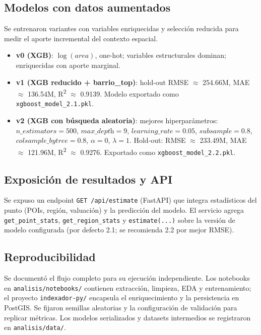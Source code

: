 \subsection*{Modelos con datos aumentados}
Se entrenaron variantes con variables enriquecidas y selección reducida para medir el aporte incremental del contexto espacial.
\begin{itemize}
    \item \textbf{v0 (XGB)}: \(\log(\textit{area})\), one-hot; variables estructurales dominan; enriquecidas con aporte marginal.
    \item \textbf{v1 (XGB reducido + barrio\_top)}: hold-out RMSE \(\approx\) 254.66M, MAE \(\approx\) 136.54M, R\textsuperscript{2} \(\approx\) 0.9139. Modelo exportado como \texttt{xgboost\_model\_2.1.pkl}.
    \item \textbf{v2 (XGB con búsqueda aleatoria)}: mejores hiperparámetros: \(n\_\textit{estimators}=500\), \(\textit{max\_depth}=9\), \(\textit{learning\_rate}=0.05\), \(\textit{subsample}=0.8\), \(\textit{colsample\_bytree}=0.8\), \(\alpha=0\), \(\lambda=1\). Hold-out: RMSE \(\approx\) 233.49M, MAE \(\approx\) 121.96M, R\textsuperscript{2} \(\approx\) 0.9276. Exportado como \texttt{xgboost\_model\_2.2.pkl}.
\end{itemize}

\subsection*{Exposición de resultados y API}
Se expuso un endpoint \texttt{GET /api/estimate} (FastAPI) que integra estadísticos del punto (POIs, región, valuación) y la predicción del modelo. El servicio agrega \texttt{get\_point\_stats}, \texttt{get\_region\_stats} y \texttt{estimate(...)} sobre la versión de modelo configurada (por defecto 2.1; se recomienda 2.2 por mejor RMSE).

\subsection*{Reproducibilidad}
Se documentó el flujo completo para su ejecución independiente. Los notebooks en \texttt{analisis/notebooks/} contienen extracción, limpieza, EDA y entrenamiento; el proyecto \texttt{indexador-py/} encapsula el enriquecimiento y la persistencia en PostGIS. Se fijaron semillas aleatorias y la configuración de validación para replicar métricas. Los modelos serializados y datasets intermedios se registraron en \texttt{analisis/data/}.

